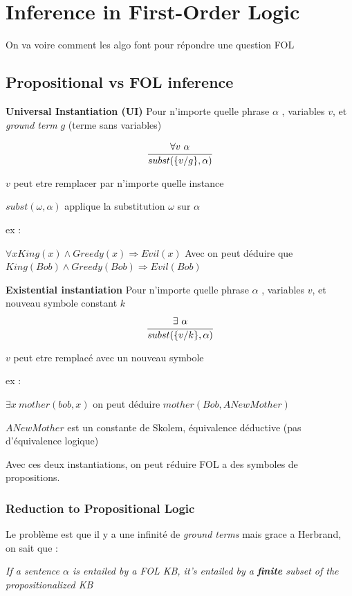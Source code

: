 \section{Inference in First-Order Logic}
	On va voire comment les algo font pour répondre une question FOL
	\subsection{Propositional vs FOL inference}
		\textbf{Universal Instantiation (UI)} Pour n'importe quelle phrase $\alpha$ , variables $v$, et \textit{ground term} $g$ (terme sans variables)
		
		\begin{equation}
			\cfrac{\forall v \ \alpha}{subst(\{v/g\}, \alpha)}
		\end{equation}
		
		$v$ peut etre remplacer par n'importe quelle instance

		$subst(\omega,\alpha)$ applique la substitution $\omega$ sur $\alpha$
		
		ex : 
		
		$\forall x King(x) \land Greedy(x) \Rightarrow Evil(x)$ Avec on peut déduire que $King(Bob) \land Greedy(Bob) \Rightarrow Evil(Bob)$
		
		\textbf{Existential instantiation}
		Pour n'importe quelle phrase $\alpha$ , variables $v$, et nouveau symbole constant $k$
			\begin{equation}
				\cfrac{\exists \ \alpha}{subst(\{v/k\}, \alpha)}
			\end{equation}
		
		$v$ peut etre remplacé avec un nouveau symbole
		
		ex :
		
		$\exists x  \ mother(bob,x)$ on peut déduire $mother(Bob, ANewMother)$
		
		$ANewMother$ est un constante de Skolem, équivalence déductive (pas d'équivalence logique)
		
		Avec ces deux instantiations, on peut réduire FOL a des symboles de propositions.
		
		\subsubsection{Reduction to Propositional Logic}	
			Le problème est que il y a une infinité de \textit{ground terms} mais grace a Herbrand, on sait que :
			
			\textit{If a sentence $\alpha$ is entailed by a FOL KB, it's entailed by a \textbf{finite} subset of the propositionalized KB}
			
